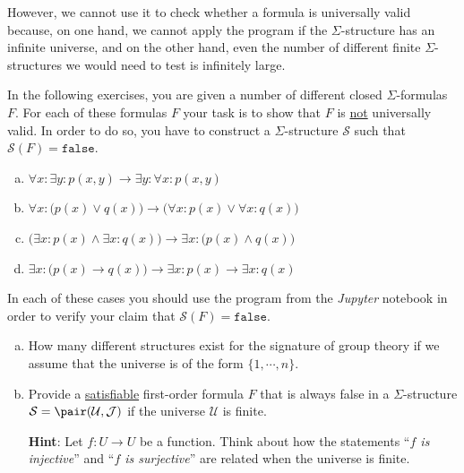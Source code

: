 However, we cannot use it to check whether a formula is universally valid because, on one hand, we cannot apply
the program if the $\Sigma$-structure has an infinite universe, and on the other hand, even the number of
different finite $\Sigma$-structures we would need to test is infinitely large. \eox 

\exerciseEng
In the following exercises, you are given a number of different closed $\Sigma$-formulas $F$. For each of these
formulas $F$ your task is to show that $F$ is \underline{not} universally valid.  In order to do so,
you have to construct a $\Sigma$-structure $\mathcal{S}$ such that $\mathcal{S}(F) = \mathtt{false}$.
\begin{enumerate}[(a)]
\item $\forall x: \exists y: p(x,y) \rightarrow \exists y: \forall x: p(x,y)$
\item $\forall x: \bigl(p(x) \lor q(x)\bigr) \rightarrow \bigl(\forall x: p(x) \lor \forall x: q(x)\bigr)$
\item $\bigl(\exists x: p(x) \land \exists x: q(x)\bigr) \rightarrow \exists x: \bigl(p(x) \land q(x)\bigr)$
\item $\exists x: \bigl(p(x) \rightarrow q(x)\bigr) \rightarrow \exists x: p(x) \rightarrow \exists x: q(x)$
\end{enumerate}
In each of these cases you should use the program from the \textsl{Jupyter} notebook
\href{https://github.com/karlstroetmann/Logic/blob/master/TypeScript/Chapter-5/01-FOL-Evaluation.ipynb}{}
in order to verify your claim that $\mathcal{S}(F) = \mathtt{false}$.

\exerciseEng
\begin{enumerate}[(a)]
\item How many different structures exist for the signature of group theory if we assume that the
      universe is of the form $\{1, \cdots, n\}$.
\item Provide a \underline{satisfiable} first-order formula $F$ that is always false in a 
      $\Sigma$-structure $\mathcal{S} = \pair(\mathcal{U},\mathcal{J})$ if  the universe $\mathcal{U}$ is finite.

      \textbf{Hint}: Let $f: U \rightarrow U$ be a function. Think about how the statements
      ``\emph{$f$ is injective}'' and ``\emph{$f$ is surjective}'' are related when the universe is finite.
      \exend  
\end{enumerate}

